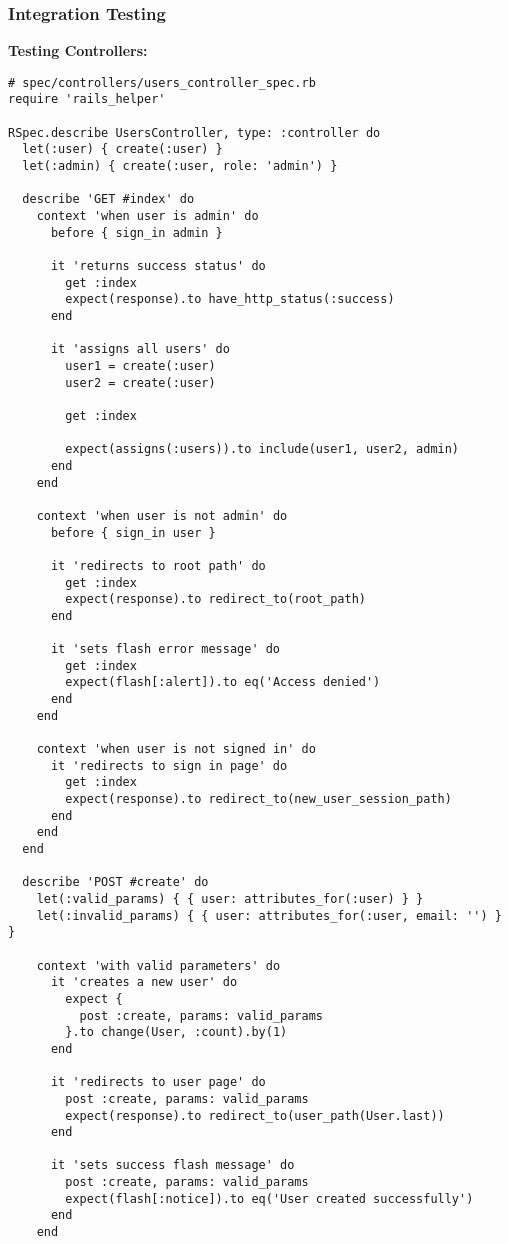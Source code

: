 \documentclass[12pt,a4paper]{article}
\begin{document}
\subsubsection{Integration Testing}

\textbf{Testing Controllers:}
\begin{lstlisting}
# spec/controllers/users_controller_spec.rb
require 'rails_helper'

RSpec.describe UsersController, type: :controller do
  let(:user) { create(:user) }
  let(:admin) { create(:user, role: 'admin') }

  describe 'GET #index' do
    context 'when user is admin' do
      before { sign_in admin }

      it 'returns success status' do
        get :index
        expect(response).to have_http_status(:success)
      end

      it 'assigns all users' do
        user1 = create(:user)
        user2 = create(:user)
        
        get :index
        
        expect(assigns(:users)).to include(user1, user2, admin)
      end
    end

    context 'when user is not admin' do
      before { sign_in user }

      it 'redirects to root path' do
        get :index
        expect(response).to redirect_to(root_path)
      end

      it 'sets flash error message' do
        get :index
        expect(flash[:alert]).to eq('Access denied')
      end
    end

    context 'when user is not signed in' do
      it 'redirects to sign in page' do
        get :index
        expect(response).to redirect_to(new_user_session_path)
      end
    end
  end

  describe 'POST #create' do
    let(:valid_params) { { user: attributes_for(:user) } }
    let(:invalid_params) { { user: attributes_for(:user, email: '') } }

    context 'with valid parameters' do
      it 'creates a new user' do
        expect {
          post :create, params: valid_params
        }.to change(User, :count).by(1)
      end

      it 'redirects to user page' do
        post :create, params: valid_params
        expect(response).to redirect_to(user_path(User.last))
      end

      it 'sets success flash message' do
        post :create, params: valid_params
        expect(flash[:notice]).to eq('User created successfully')
      end
    end


\end{lstlisting}
\end{document}
